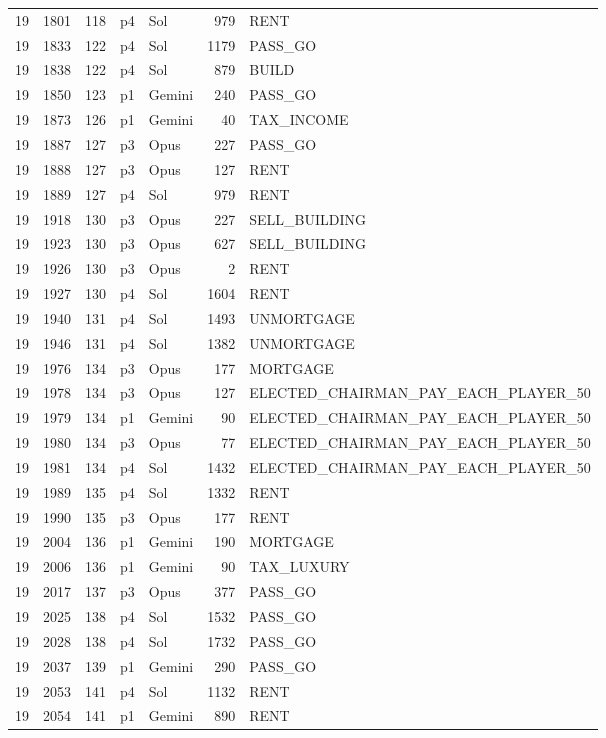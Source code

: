 \begin{longtable}{r r r l l r >{\ttfamily}l}
19 & 1801 & 118 & p4 & Sol & 979 & RENT \\
19 & 1833 & 122 & p4 & Sol & 1179 & PASS\_GO \\
19 & 1838 & 122 & p4 & Sol & 879 & BUILD \\
19 & 1850 & 123 & p1 & Gemini & 240 & PASS\_GO \\
19 & 1873 & 126 & p1 & Gemini & 40 & TAX\_INCOME \\
19 & 1887 & 127 & p3 & Opus & 227 & PASS\_GO \\
19 & 1888 & 127 & p3 & Opus & 127 & RENT \\
19 & 1889 & 127 & p4 & Sol & 979 & RENT \\
19 & 1918 & 130 & p3 & Opus & 227 & SELL\_BUILDING \\
19 & 1923 & 130 & p3 & Opus & 627 & SELL\_BUILDING \\
19 & 1926 & 130 & p3 & Opus & 2 & RENT \\
19 & 1927 & 130 & p4 & Sol & 1604 & RENT \\
19 & 1940 & 131 & p4 & Sol & 1493 & UNMORTGAGE \\
19 & 1946 & 131 & p4 & Sol & 1382 & UNMORTGAGE \\
19 & 1976 & 134 & p3 & Opus & 177 & MORTGAGE \\
19 & 1978 & 134 & p3 & Opus & 127 & ELECTED\_CHAIRMAN\_PAY\_EACH\_PLAYER\_50 \\
19 & 1979 & 134 & p1 & Gemini & 90 & ELECTED\_CHAIRMAN\_PAY\_EACH\_PLAYER\_50 \\
19 & 1980 & 134 & p3 & Opus & 77 & ELECTED\_CHAIRMAN\_PAY\_EACH\_PLAYER\_50 \\
19 & 1981 & 134 & p4 & Sol & 1432 & ELECTED\_CHAIRMAN\_PAY\_EACH\_PLAYER\_50 \\
19 & 1989 & 135 & p4 & Sol & 1332 & RENT \\
19 & 1990 & 135 & p3 & Opus & 177 & RENT \\
19 & 2004 & 136 & p1 & Gemini & 190 & MORTGAGE \\
19 & 2006 & 136 & p1 & Gemini & 90 & TAX\_LUXURY \\
19 & 2017 & 137 & p3 & Opus & 377 & PASS\_GO \\
19 & 2025 & 138 & p4 & Sol & 1532 & PASS\_GO \\
19 & 2028 & 138 & p4 & Sol & 1732 & PASS\_GO \\
19 & 2037 & 139 & p1 & Gemini & 290 & PASS\_GO \\
19 & 2053 & 141 & p4 & Sol & 1132 & RENT \\
19 & 2054 & 141 & p1 & Gemini & 890 & RENT \\

\end{longtable}

